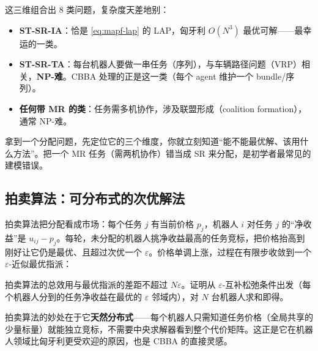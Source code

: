 这三维组合出 $8$ 类问题，复杂度天差地别：

\begin{itemize}
  \item \textbf{ST-SR-IA}：恰是 \cref{eq:mapf-lap} 的 LAP，匈牙利 $O(N^3)$ 最优可解——最幸运的一类。
  \item \textbf{ST-SR-TA}：每台机器人要做一串任务（序列），与车辆路径问题（VRP）相关，\textbf{NP-难}。CBBA 处理的正是这一类（每个 agent 维护一个 bundle/序列）。
  \item \textbf{任何带 MR 的类}：任务需多机协作，涉及联盟形成（coalition formation），通常 NP-难。
\end{itemize}

\begin{insight}[分类法的价值]
拿到一个分配问题，先定位它的三个维度，你就立刻知道“能不能最优解、该用什么方法”。把一个 MR 任务（需两机协作）错当成 SR 来分配，是初学者最常见的建模错误。
\end{insight}

\subsection{拍卖算法：可分布式的次优解法}
\label{sec:mapf-auction}

拍卖算法把分配看成市场：每个任务 $j$ 有当前价格 $p_j$，机器人 $i$ 对任务 $j$ 的“净收益”是 $u_{ij}-p_j$。每轮，未分配的机器人挑净收益最高的任务竞标，把价格抬高到刚好让它仍是最优、且超过次优一个 $\varepsilon$。价格单调上涨，过程在有限步收敛到一个 $\varepsilon$-近似最优指派\cite{bertsekas1988auction}：

\begin{theorem}\label{thm:mapf-auction}
拍卖算法的总效用与最优指派的差距不超过 $N\varepsilon$。证明从 $\varepsilon$-互补松弛条件出发（每个机器人分到的任务净收益在最优的 $\varepsilon$ 邻域内），对 $N$ 台机器人求和即得\cite{bertsekas1988auction}。
\end{theorem}

\begin{insight}[价格作为全局协调信号]
拍卖算法的妙处在于它\textbf{天然分布式}——每个机器人只需知道任务价格（全局共享的少量标量）就能独立竞标，不需要中央求解器看到整个代价矩阵。这正是它在机器人领域比匈牙利更受欢迎的原因，也是 CBBA 的直接灵感。
\end{insight}

